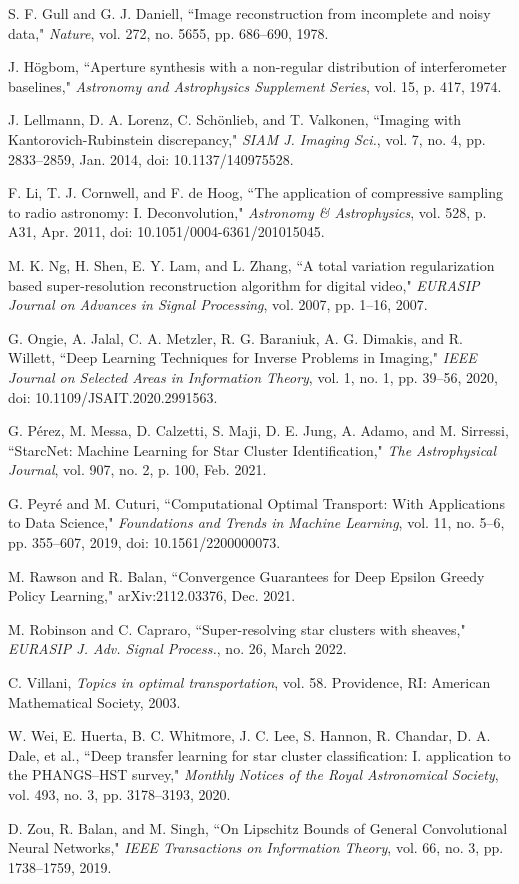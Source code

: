 \documentclass[conference]{IEEEtran}
\begin{document}
\begin{thebibliography}{00}
S. F. Gull and G. J. Daniell, ``Image reconstruction from incomplete and noisy data," \emph{Nature}, vol. 272, no. 5655, pp. 686–690, 1978.

J. Högbom, ``Aperture synthesis with a non-regular distribution of interferometer baselines," \emph{Astronomy and Astrophysics Supplement Series}, vol. 15, p. 417, 1974.

J. Lellmann, D. A. Lorenz, C. Schönlieb, and T. Valkonen, ``Imaging with Kantorovich-Rubinstein discrepancy," \emph{SIAM J. Imaging Sci.}, vol. 7, no. 4, pp. 2833–2859, Jan. 2014, doi: 10.1137/140975528.

F. Li, T. J. Cornwell, and F. de Hoog, ``The application of compressive sampling to radio astronomy: I. Deconvolution," \emph{Astronomy \& Astrophysics}, vol. 528, p. A31, Apr. 2011, doi: 10.1051/0004-6361/201015045.

M. K. Ng, H. Shen, E. Y. Lam, and L. Zhang, ``A total variation regularization based super-resolution reconstruction algorithm for digital video," \emph{EURASIP Journal on Advances in Signal Processing}, vol. 2007, pp. 1–16, 2007.

G. Ongie, A. Jalal, C. A. Metzler, R. G. Baraniuk, A. G. Dimakis, and R. Willett, ``Deep Learning Techniques for Inverse Problems in Imaging," \emph{IEEE Journal on Selected Areas in Information Theory}, vol. 1, no. 1, pp. 39–56, 2020, doi: 10.1109/JSAIT.2020.2991563.

G. Pérez, M. Messa, D. Calzetti, S. Maji, D. E. Jung, A. Adamo, and M. Sirressi, ``StarcNet: Machine Learning for Star Cluster Identification," \emph{The Astrophysical Journal}, vol. 907, no. 2, p. 100, Feb. 2021.

G. Peyré and M. Cuturi, ``Computational Optimal Transport: With Applications to Data Science," \emph{Foundations and Trends in Machine Learning}, vol. 11, no. 5–6, pp. 355–607, 2019, doi: 10.1561/2200000073.

M. Rawson and R. Balan, ``Convergence Guarantees for Deep Epsilon Greedy Policy Learning," arXiv:2112.03376, Dec. 2021.

M. Robinson and C. Capraro, ``Super-resolving star clusters with sheaves," \emph{EURASIP J. Adv. Signal Process.}, no. 26, March 2022. 

C. Villani, \emph{Topics in optimal transportation}, vol. 58. Providence, RI: American Mathematical Society, 2003.

W. Wei, E. Huerta, B. C. Whitmore, J. C. Lee, S. Hannon, R. Chandar, D. A. Dale, et al., ``Deep transfer learning for star cluster classification: I. application to the PHANGS–HST survey," \emph{Monthly Notices of the Royal Astronomical Society}, vol. 493, no. 3, pp. 3178–3193, 2020.

D. Zou, R. Balan, and M. Singh, ``On Lipschitz Bounds of General Convolutional Neural Networks," \emph{IEEE Transactions on Information Theory}, vol. 66, no. 3, pp. 1738–1759, 2019.

\end{thebibliography}
\end{document}
